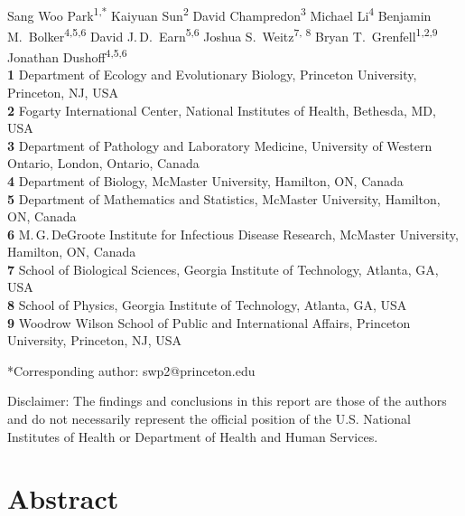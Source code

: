 \documentclass[12pt]{article}
\date{\today}
\begin{document}
\begin{flushleft}{
	\Large
	\textbf{}
}
\newline
\\
Sang Woo Park\textsuperscript{1,*}
Kaiyuan Sun\textsuperscript{2}
David Champredon\textsuperscript{3}
Michael Li\textsuperscript{4}
Benjamin M.\ Bolker\textsuperscript{4,5,6}
David J.\,D.\ Earn\textsuperscript{5,6}
Joshua S.\ Weitz\textsuperscript{7, 8}
Bryan T.\ Grenfell\textsuperscript{1,2,9}
Jonathan Dushoff\textsuperscript{4,5,6}
\\
\bigskip
\textbf{1} Department of Ecology and Evolutionary Biology, Princeton University, Princeton, NJ, USA
\\
\textbf{2} Fogarty International Center, National Institutes of Health, Bethesda, MD, USA
\\
\textbf{3} Department of Pathology and Laboratory Medicine, University of Western Ontario, London, Ontario, Canada
\\
\textbf{4} Department of Biology, McMaster University, Hamilton, ON, Canada
\\
\textbf{5} Department of Mathematics and Statistics, McMaster University, Hamilton, ON, Canada
\\
\textbf{6} M.\,G.\,DeGroote Institute for Infectious Disease Research, McMaster University, Hamilton, ON, Canada
\\
\textbf{7} School of Biological Sciences, Georgia Institute of Technology, Atlanta, GA, USA
\\
\textbf{8} School of Physics, Georgia Institute of Technology, Atlanta, GA, USA
\\
\textbf{9} Woodrow Wilson School of Public and International Affairs, Princeton University, Princeton, NJ, USA
\\
\bigskip

*Corresponding author: swp2@princeton.edu
\bigskip

Disclaimer: The findings and conclusions in this report are those of the authors and do not necessarily represent the official position of the U.S. National Institutes of Health or Department of Health and Human Services.
\end{flushleft}

\pagebreak

\section*{Abstract}
\end{document}
